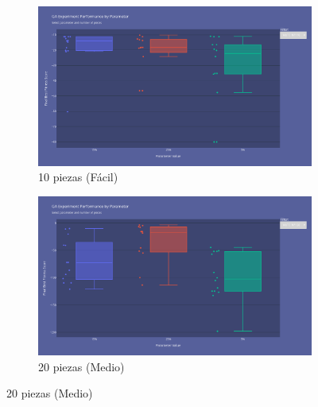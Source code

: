 \documentclass[11pt,spanish,listoffigures,listoftables]{tfgetsinf}
\begin{document}
\begin{figure}[H]
    \centering
    \begin{subfigure}[b]{0.48\textwidth}
        \centering
        \includegraphics[width=\textwidth]{images/GA_np-10_mutation.png}
        \caption{10 piezas (Fácil)}
        \label{fig:ga_np10_mutation}
    \end{subfigure}
    \hfill
    \begin{subfigure}[b]{0.48\textwidth}
        \centering
        \includegraphics[width=\textwidth]{images/GA_np-20_mutation.png}
        \caption{20 piezas (Medio)}
        \label{fig:ga_np20_mutation}
    \end{subfigure}
    
    \vspace{0.5cm}
    

\end{figure}
\end{document}

